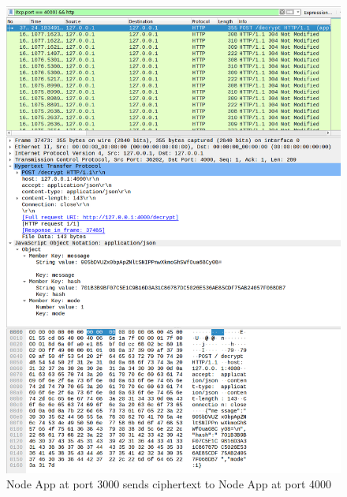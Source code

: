 \begin{figure}[!h]
  \centering
      \includegraphics[width=1\textwidth]{Figures/b16.png}
  \caption[Node App at port 3000 sends ciphertext to Node App at port 4000 ]{Node App at port 3000 sends ciphertext to Node App at port 4000 }
  \label{fig:b16}
\end{figure}
\FloatBarrier


